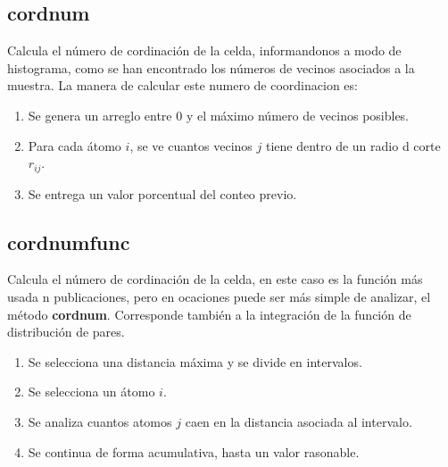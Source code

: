 \subsection{cordnum}
Calcula el n\'umero de cordinaci\'on de la celda, informandonos a modo de histograma, como se han encontrado los n\'umeros de vecinos asociados a la muestra. La manera de calcular este numero de coordinacion es:
\begin{enumerate}
 \item Se genera un arreglo entre 0 y el m\'aximo n\'umero de vecinos posibles.
 \item Para cada \'atomo $i$, se ve cuantos vecinos $j$ tiene dentro de un radio d corte $r_{ij}$.
 \item Se entrega un valor porcentual del conteo previo.
\end{enumerate}



\subsection{cordnumfunc}
Calcula el n\'umero de cordinaci\'on de la celda, en este caso es la funci\'on m\'as usada n publicaciones, pero en ocaciones puede ser m\'as simple de analizar, el m\'etodo \textbf{cordnum}. Corresponde tambi\'en a la integraci\'on de la funci\'on de distribuci\'on de pares.
\begin{enumerate}
 \item Se selecciona una distancia m\'axima y se divide en intervalos.
 \item Se selecciona un \'atomo $i$.
 \item Se analiza cuantos atomos $j$ caen en la distancia asociada al intervalo.
 \item Se continua de forma acumulativa, hasta un valor rasonable.
\end{enumerate}

